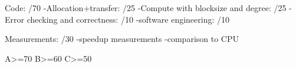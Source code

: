 Code: /70
     -Allocation+transfer: /25
     -Compute with blocksize and degree: /25
     -Error checking and correctness: /10
     -software engineering: /10

Measurements: /30
     -speedup measurements
     -comparison to CPU

A>=70
B>=60
C>=50
